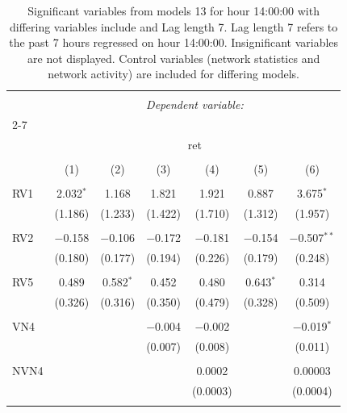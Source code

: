 
\begin{table}[!htbp] \centering 
  \caption{Significant variables from models 13 for hour 14:00:00 with differing variables include 
                               and Lag length 7. Lag length 7 refers to the past 7 hours regressed on hour 14:00:00. 
                               Insignificant variables are not displayed. 
                               Control variables (network statistics and network activity) are 
                               included for differing models.} 
  \label{RVmodels1_t_hourlagged1} 
\scriptsize 
\begin{tabular}{@{\extracolsep{5pt}}lcccccc} 
\\[-1.8ex]\hline 
\hline \\[-1.8ex] 
 & \multicolumn{6}{c}{\textit{Dependent variable:}} \\ 
\cline{2-7} 
\\[-1.8ex] & \multicolumn{6}{c}{ret} \\ 
\\[-1.8ex] & (1) & (2) & (3) & (4) & (5) & (6)\\ 
\hline \\[-1.8ex] 
 RV1 & 2.032$^{*}$ & 1.168 & 1.821 & 1.921 & 0.887 & 3.675$^{*}$ \\ 
  & (1.186) & (1.233) & (1.422) & (1.710) & (1.312) & (1.957) \\ 
  & & & & & & \\ 
 RV2 & $-$0.158 & $-$0.106 & $-$0.172 & $-$0.181 & $-$0.154 & $-$0.507$^{**}$ \\ 
  & (0.180) & (0.177) & (0.194) & (0.226) & (0.179) & (0.248) \\ 
  & & & & & & \\ 
 RV5 & 0.489 & 0.582$^{*}$ & 0.452 & 0.480 & 0.643$^{*}$ & 0.314 \\ 
  & (0.326) & (0.316) & (0.350) & (0.479) & (0.328) & (0.509) \\ 
  & & & & & & \\ 
 VN4 &  &  & $-$0.004 & $-$0.002 &  & $-$0.019$^{*}$ \\ 
  &  &  & (0.007) & (0.008) &  & (0.011) \\ 
  & & & & & & \\ 
 NVN4 &  &  &  & 0.0002 &  & 0.00003 \\ 
  &  &  &  & (0.0003) &  & (0.0004) \\ 
  & & & & & & \\ 

\end{tabular}
\end{table}
